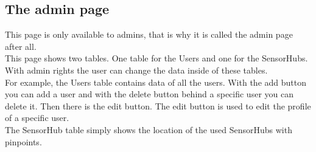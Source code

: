 \documentclass[a4paper]{article}
\begin{document}
\pagebreak

\subsection{The admin page}
This page is only available to admins, that is why it is called the admin page after all.
\\
\indent
This page shows two tables. One table for the Users and one for the SensorHubs. With admin rights the user can change the data inside of these tables.
\\
\indent
For example, the Users table contains data of all the users. With the add button you can add a user and with the delete button behind a specific user you can delete it. Then there is the edit button. The edit button is used to edit the profile of a specific user.
\\
\indent
The SensorHub table simply shows the location of the used SensorHubs with pinpoints.
\end{document}
